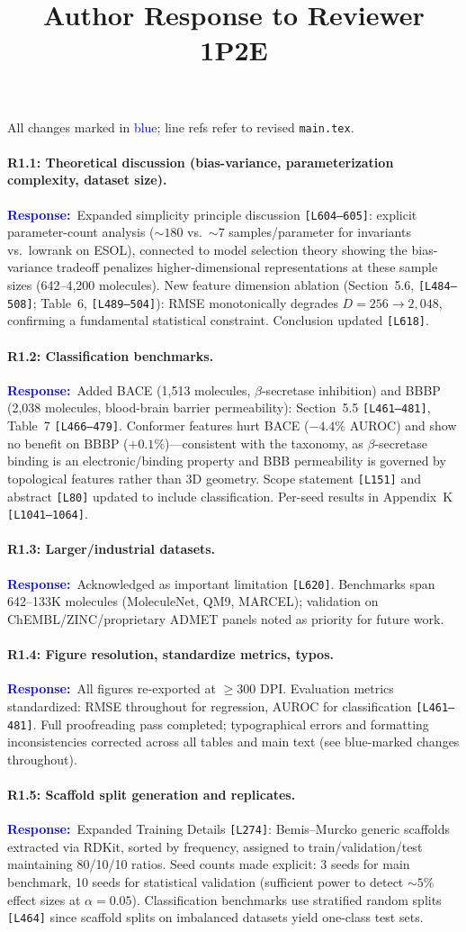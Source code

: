 \documentclass[11pt]{article}
\title{Author Response to Reviewer 1P2E}
\author{}
\date{}
\newcommand{\point}[1]{\paragraph{#1}}
\newcommand{\response}{\textcolor{blue}{\textbf{Response:}}~}
\newcommand{\lines}[1]{\texttt{[L#1]}}
\begin{document}
\maketitle
\vspace{-2em}

All changes marked in \textcolor{blue}{blue}; line refs refer to revised \texttt{main.tex}.

\point{R1.1: Theoretical discussion (bias-variance, parameterization complexity, dataset size).}

\response Expanded simplicity principle discussion \lines{604--605}: explicit parameter-count analysis (${\sim}180$ vs.\ ${\sim}7$ samples/parameter for invariants vs.\ lowrank on ESOL), connected to model selection theory showing the bias-variance tradeoff penalizes higher-dimensional representations at these sample sizes (642--4,200 molecules). New feature dimension ablation (Section~5.6, \lines{484--508}; Table~6, \lines{489--504}): RMSE monotonically degrades $D{=}256 \to 2{,}048$, confirming a fundamental statistical constraint. Conclusion updated \lines{618}.

\point{R1.2: Classification benchmarks.}

\response Added BACE (1,513 molecules, $\beta$-secretase inhibition) and BBBP (2,038 molecules, blood-brain barrier permeability): Section~5.5 \lines{461--481}, Table~7 \lines{466--479}. Conformer features hurt BACE ($-4.4\%$ AUROC) and show no benefit on BBBP ($+0.1\%$)---consistent with the taxonomy, as $\beta$-secretase binding is an electronic/binding property and BBB permeability is governed by topological features rather than 3D geometry. Scope statement \lines{151} and abstract \lines{80} updated to include classification. Per-seed results in Appendix~K \lines{1041--1064}.

\point{R1.3: Larger/industrial datasets.}

\response Acknowledged as important limitation \lines{620}. Benchmarks span 642--133K molecules (MoleculeNet, QM9, MARCEL); validation on ChEMBL/ZINC/proprietary ADMET panels noted as priority for future work.

\point{R1.4: Figure resolution, standardize metrics, typos.}

\response All figures re-exported at $\geq$300 DPI. Evaluation metrics standardized: RMSE throughout for regression, AUROC for classification \lines{461--481}. Full proofreading pass completed; typographical errors and formatting inconsistencies corrected across all tables and main text (see blue-marked changes throughout).

\point{R1.5: Scaffold split generation and replicates.}

\response Expanded Training Details \lines{274}: Bemis--Murcko generic scaffolds extracted via RDKit, sorted by frequency, assigned to train/validation/test maintaining 80/10/10 ratios. Seed counts made explicit: 3 seeds for main benchmark, 10 seeds for statistical validation (sufficient power to detect ${\sim}5\%$ effect sizes at $\alpha = 0.05$). Classification benchmarks use stratified random splits \lines{464} since scaffold splits on imbalanced datasets yield one-class test sets.
\end{document}

